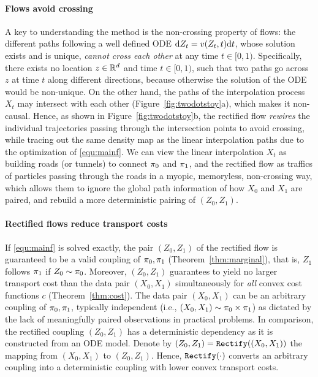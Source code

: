 \paragraph{Flows avoid crossing} %
A key to understanding the method is the non-crossing property of flows: 
the different paths 
following a well defined ODE $\mathrm{d} Z_t = v(Z_t,t) \mathrm{d}t $, 
whose solution exists and is unique, \emph{cannot cross each other} at any time $t\in[0,1)$. 
Specifically,
there exists no location $z\in\mathbb{R}^d$ and time $t\in[0,1)$, such that two paths go across $z$ at time $t$ along different directions, because otherwise the solution of the ODE would be non-unique. 
On the other hand, the paths of the interpolation process $X_t$ may intersect with each other (Figure~\ref{fig:twodotstoy}a), which makes it non-causal. 
Hence, %
as shown in Figure~\ref{fig:twodotstoy}b,  
the rectified flow 
\emph{rewires} the individual trajectories passing through the intersection points to avoid crossing, while
tracing out the same density map as the linear interpolation paths
due to the optimization of 
\eqref{equ:mainf}.  
We can view the linear interpolation $X_t$ as building
 roads (or tunnels) to connect ${\pi}_0$ and ${\pi}_1$, 
 and the rectified flow as traffics of particles passing through the roads in a myopic, memoryless, non-crossing way, 
 which allows them to ignore the global  
 path information of how $X_0$ and $X_1$ are paired, 
 and rebuild a more deterministic pairing of $(Z_0,Z_1)$. 


\paragraph{Rectified flows reduce transport costs} 
If \eqref{equ:mainf} is solved exactly, 
the pair $(Z_0,Z_1)$ 
of the rectified flow 
is guaranteed to be a valid coupling of ${\pi}_0,{\pi}_1$ (Theorem~\ref{thm:marginal}), 
that is, $Z_1$ follows ${\pi}_1$ if $Z_0\sim {\pi}_0$.  
Moreover, $(Z_0,Z_1)$ guarantees to yield no larger transport cost than the data pair $(X_0,X_1)$ simultaneously for \emph{all} convex cost functions $c$ (Theorem~\ref{thm:cost}). 
The data pair $(X_0,X_1)$ can be an arbitrary coupling of ${\pi}_0,{\pi}_1$, typically independent  (i.e., $(X_0,X_1)\sim {\pi}_0\times {\pi}_1$)  
as dictated by the lack of meaningfully paired observations in practical problems. %
In comparison, 
the rectified coupling $(Z_0,Z_1)$ has a deterministic dependency as it is constructed from an ODE model. 
Denote by $(Z_0,Z_1)=\mathtt{Rectify}((X_0,X_1))$ 
the mapping from $(X_0,X_1)$ to $(Z_0,Z_1)$. 
Hence, %
$\mathtt{Rectify}(\cdot)$ converts an arbitrary coupling into a deterministic coupling with lower convex transport costs. 









